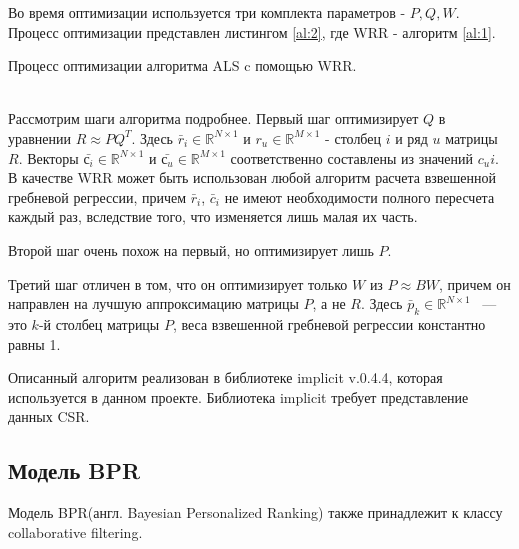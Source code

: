 \documentclass[14pt]{mmcs_article}
\begin{document}
Во время оптимизации используется три комплекта параметров - $P, Q, W$. Процесс оптимизации представлен листингом \ref{al:2}, где WRR - алгоритм \ref{al:1}.\\
\begin{algorithm}[H]\label{al:2}
	\caption{Процесс оптимизации алгоритма ALS c помощью WRR.}
\end{algorithm}
\ \\
Рассмотрим шаги алгоритма подробнее.
Первый шаг оптимизирует $Q$ в уравнении $R \approx PQ^T$. Здесь $\bar r_i \in \mathbb{R}^{N \times 1}$  и  $r_u \in \mathbb{R}^{M \times 1}$ - столбец $i$ и ряд $u$ матрицы $R$. Векторы $ \bar{с_i} \in \mathbb{R}^{N \times 1}$ и $\bar{с_u} \in \mathbb{R}^{M \times 1}$ соответственно составлены из значений $c_ui$. В качестве WRR может быть использован любой алгоритм расчета взвешенной гребневой регрессии, причем $\bar r_i$, $\bar c_i$ не имеют необходимости полного пересчета каждый раз, вследствие того, что изменяется лишь малая их часть. 

Второй шаг очень похож на первый, но оптимизирует лишь $P$. 

Третий шаг отличен в том, что он оптимизирует только $W$ из $P \approx BW$, причем он направлен на лучшую аппроксимацию матрицы $P$, а не $R$. Здесь  $\bar p_k \in \mathbb{R}^{N \times 1}$ ~--- это $k$-й столбец матрицы $P$, веса взвешенной гребневой регрессии константно равны 1.

Описанный алгоритм реализован в библиотеке implicit v.0.4.4, которая используется в данном проекте. Библиотека implicit требует представление данных CSR.


\subsection{Модель BPR}
Модель BPR(англ. Bayesian Personalized Ranking) также принадлежит к классу collaborative filtering. 
\end{document}
